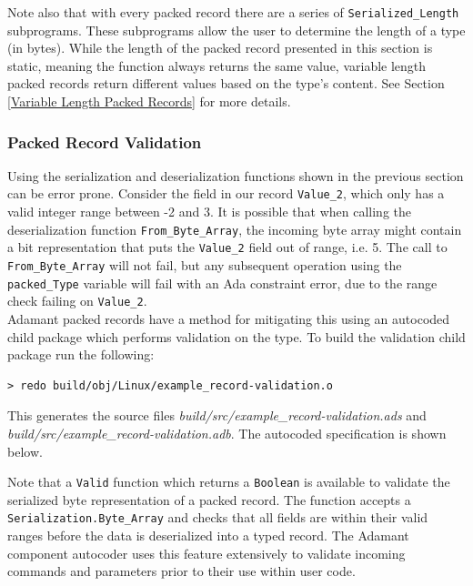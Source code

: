 Note also that with every packed record there are a series of \texttt{Serialized\_Length} subprograms. These subprograms allow the user to determine the length of a type (in bytes). While the length of the packed record presented in this section is static, meaning the function always returns the same value, variable length packed records return different values based on the type's content. See Section \ref{Variable Length Packed Records} for more details.

\subsubsection{Packed Record Validation} \label{Packed Record Validation}

Using the serialization and deserialization functions shown in the previous section can be error prone. Consider the field in our record \texttt{Value\_2}, which only has a valid integer range between -2 and 3. It is possible that when calling the deserialization function \texttt{From\_Byte\_Array}, the incoming byte array might contain a bit representation that puts the \texttt{Value\_2} field out of range, i.e. 5. The call to \texttt{From\_Byte\_Array} will not fail, but any subsequent operation using the \texttt{packed\_Type} variable will fail with an Ada constraint error, due to the range check failing on \texttt{Value\_2}. \\

Adamant packed records have a method for mitigating this using an autocoded child package which performs validation on the type. To build the validation child package run the following:

\vspace{5mm} %
\begin{verbatim}
> redo build/obj/Linux/example_record-validation.o
\end{verbatim}
\vspace{5mm} %

This generates the source files \textit{build/src/example\_record-validation.ads} and \textit{build/src/example\_record-validation.adb}. The autocoded specification is shown below.


Note that a \texttt{Valid} function which returns a \texttt{Boolean} is available to validate the serialized byte representation of a packed record. The function accepts a \texttt{Serialization.Byte\_Array} and checks that all fields are within their valid ranges before the data is deserialized into a typed record. The Adamant component autocoder uses this feature extensively to validate incoming commands and parameters prior to their use within user code.\\

